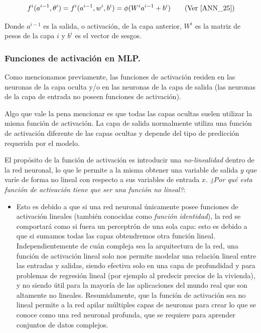 \documentclass[12pt,a4paper]{article}
\begin{document}
\begin{sloppypar}
\begin{equation}\label{eq:ecuacion_6_ANN}
f^i(a^{i-1},\theta^i) = f^i(a^{i-1},w^i,b^i) = \phi(W^{i}a^{i-1}+b^i)    \qquad  \text{(Ver \cite{ANN_25})}
\end{equation}

Donde $a^{i-1}$ es la salida, o activación, de la capa anterior, $W^i$ es la matriz de pesos de la capa $i$ y $b^i$ es el vector de sesgos.

\subsubsection{Funciones de activación en MLP.}\label{Func_activ}

Como mencionamos previamente, las funciones de activación residen en las neuronas de la capa oculta y/o en las neuronas de la capa de salida (las neuronas de la capa de entrada no poseen funciones de activación).

Algo que vale la pena mencionar es que todas las capas ocultas suelen utilizar la misma función de activación. La capa de salida normalmente utiliza una función de activación diferente de las capas ocultas y depende del tipo de predicción requerida por el modelo.

El propósito de la función de activación es introducir una \textit{no-linealidad} dentro de la red neuronal, lo que le permite a la misma obtener una variable de salida $y$ que varíe de forma no lineal con respecto a sus variables de entrada $x$. \textit{¿Por qué esta función de activación tiene que ser una función no lineal?}:
\begin{itemize}
\item Esto es debido a que si una red neuronal únicamente posee funciones de activación lineales (también conocidas como \textit{función identidad}), la red se comportará como si fuera un perceptrón de una sola capa: esto es debido a que si sumamos todas las capas obtendremos otra función lineal.
Independientemente de cuán compleja sea la arquitectura de la red, una función de activación lineal solo nos permite modelar una relación lineal entre las entradas y salidas, siendo efectiva solo en una capa de profundidad y para problemas de regresión lineal (por ejemplo al predecir precios de la vivienda), y no siendo útil para la mayoría de las aplicaciones del mundo real que son altamente no lineales.
Resumidamente, que la función de activación sea no lineal permite a la red apilar múltiples capas de neuronas para crear lo que se conoce como una red neuronal profunda, que se requiere para aprender conjuntos de datos complejos.
\end{itemize}


\end{sloppypar}
\end{document}
